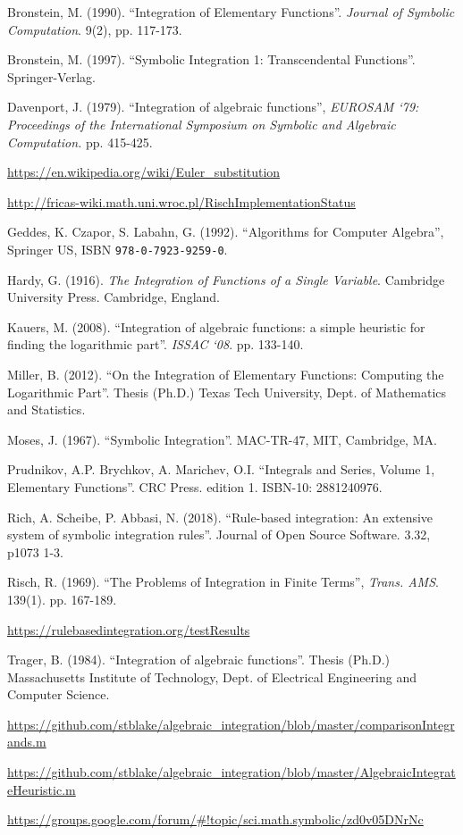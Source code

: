 \documentclass[12pt]{article}
\numberwithin{equation}{section}
\theoremstyle{definition}
\begin{document}
\begin{thebibliography}{99}

 Bronstein, M. (1990). ``Integration of Elementary Functions''. 
\textit{Journal of Symbolic Computation}. 9(2), pp. 117-173.

 Bronstein, M. (1997). ``Symbolic Integration 1: Transcendental Functions''. Springer-Verlag.

 Davenport, J. (1979). ``Integration of algebraic functions'', \textit{EUROSAM `79: Proceedings of the International Symposium on Symbolic and Algebraic Computation. }pp. 415-425.

 \url{https://en.wikipedia.org/wiki/Euler_substitution}

 \url{http://fricas-wiki.math.uni.wroc.pl/RischImplementationStatus}

 Geddes, K. Czapor, S. Labahn, G. (1992). ``Algorithms for Computer Algebra'', Springer US, 
ISBN \verb~978-0-7923-9259-0~.

 Hardy, G. (1916). \textit{The Integration of Functions of a Single Variable}. Cambridge 
University Press. Cambridge, England.

 Kauers, M. (2008). ``Integration of algebraic functions: a simple heuristic for finding the logarithmic part''. \textit{ISSAC `08}. pp. 133-140.

 Miller, B. (2012). ``On the Integration of Elementary Functions: Computing the Logarithmic Part''. Thesis (Ph.D.) Texas Tech University, Dept. of Mathematics and Statistics.

 Moses, J. (1967). ``Symbolic Integration''. MAC-TR-47, MIT, Cambridge, MA.

	Prudnikov, A.P. Brychkov, A. Marichev, O.I. ``Integrals and Series, Volume 1, Elementary Functions''. CRC Press. edition 1. ISBN-10: 2881240976.

 Rich, A. Scheibe, P. Abbasi, N. (2018). ``Rule-based integration: An extensive system of symbolic integration rules''. Journal of Open Source Software. 3.32, p1073 1-3.

 Risch, R. (1969). ``The Problems of Integration in Finite Terms'', \textit{ Trans. AMS}. 139(1). pp. 167-189.

 \url{https://rulebasedintegration.org/testResults}

 Trager, B. (1984). ``Integration of algebraic functions''. Thesis (Ph.D.) Massachusetts Institute of Technology, Dept. of Electrical Engineering and Computer Science.

 \url{https://github.com/stblake/algebraic_integration/blob/master/comparisonIntegrands.m}

 \url{https://github.com/stblake/algebraic_integration/blob/master/AlgebraicIntegrateHeuristic.m}

 \url{https://groups.google.com/forum/#!topic/sci.math.symbolic/zd0v05DNrNc}

\end{thebibliography}
\end{document}

